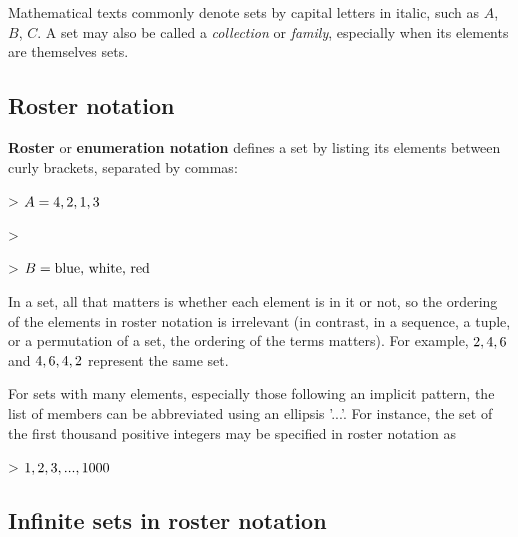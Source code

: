 Mathematical texts commonly denote sets by capital letters in italic, such as $A$, $B$,
$C$. A set may also be called a \textit{collection} or \textit{family}, especially when
its elements are themselves sets.




\subsection{Roster notation}
\label{sss:rost-91a9}




\textbf{Roster} or \textbf{enumeration notation} defines a set by listing its elements between curly brackets, separated by commas:



> $A = \\{4, 2, 1, 3\\}$

>

> $B = \\{ \text{blue, white, red} \\}$



In a set, all that matters is whether each element is in it or not, so the ordering of the
elements in roster notation is irrelevant (in contrast, in a sequence, a tuple, or a
permutation of a set, the ordering of the terms matters). For example, $\\{2, 4, 6\\}$ and
$\\{4, 6, 4, 2\\}$ represent the same set.



For sets with many elements, especially those following an implicit pattern, the list of
members can be abbreviated using an ellipsis '...'. For instance, the set of the first
thousand positive integers may be specified in roster notation as



> $\\{1, 2, 3, ..., 1000\\}$




\subsection{Infinite sets in roster notation}
\label{sss:infi-9517}




